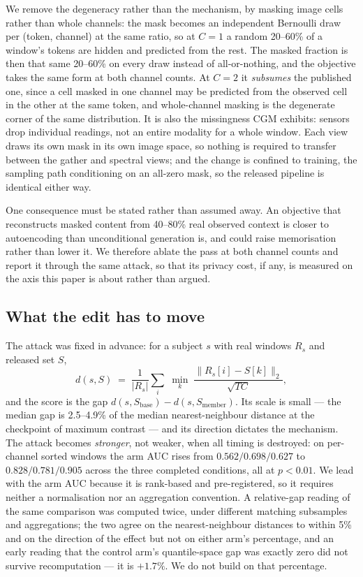 \documentclass[journal]{IEEEtran}
\begin{document}
We remove the degeneracy rather than the mechanism, by masking image cells rather than whole
channels: the mask becomes an independent Bernoulli draw per (token, channel) at the same
ratio, so at $C=1$ a random 20--60\% of a window's tokens are hidden and predicted from the
rest. The masked fraction is then that same 20--60\% on every draw instead of all-or-nothing,
and the objective takes the same form at both channel counts. At $C=2$ it \emph{subsumes} the
published one, since a cell masked in one channel may be predicted from the observed cell in
the other at the same token, and whole-channel masking is the degenerate corner of the same
distribution. It is also the missingness CGM exhibits: sensors drop individual readings, not
an entire modality for a whole window. Each view draws its own mask in its own image space,
so nothing is required to transfer between the gather and spectral views; and the change is
confined to training, the sampling path conditioning on an all-zero mask, so the released
pipeline is identical either way.

One consequence must be stated rather than assumed away. An objective that reconstructs
masked content from 40--80\% real observed context is closer to autoencoding than
unconditional generation is, and could raise memorisation rather than lower it. We therefore
ablate the pass at both channel counts and report it through the same attack, so that its
privacy cost, if any, is measured on the axis this paper is about rather than argued.

\subsection{What the edit has to move}

The attack was fixed in advance: for a subject $s$ with real windows $R_s$ and released set
$S$,
\begin{equation}
d(s,S)\;=\;\frac{1}{|R_s|}\sum_{i}\;\min_{k}\;
\frac{\lVert R_s[i]-S[k]\rVert_2}{\sqrt{TC}},
\label{eq:attack}
\end{equation}
and the score is the gap $d(s,S_{\text{base}})-d(s,S_{\text{member}})$. Its scale is small
--- the median gap is 2.5--4.9\% of the median nearest-neighbour distance at the
checkpoint of maximum contrast --- and its direction dictates the mechanism. The attack becomes
\emph{stronger}, not weaker, when all timing is destroyed: on per-channel sorted windows the
arm AUC rises from $0.562/0.698/0.627$ to $0.828/0.781/0.905$ across the three completed
conditions, all at $p<0.01$. We lead with the arm AUC because it is rank-based and
pre-registered, so it requires neither a normalisation nor an aggregation convention. A
relative-gap reading of the same comparison was computed twice, under different matching
subsamples and aggregations; the two agree on the nearest-neighbour distances to within 5\%
and on the direction of the effect but not on either arm's percentage, and an early reading
that the control arm's quantile-space gap was exactly zero did not survive recomputation ---
it is $+1.7\%$. We do not build on that percentage.
\end{document}
